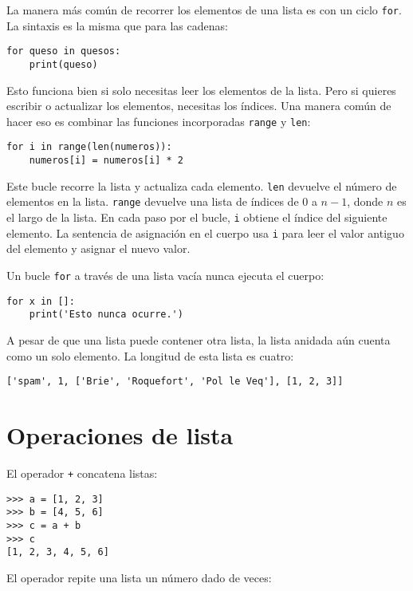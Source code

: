 \documentclass[10pt]{book}
\begin{document}
La manera más común de recorrer los elementos de una lista es
con un ciclo {\tt for}.  La sintaxis es la misma que para las cadenas:

\begin{verbatim}
for queso in quesos:
    print(queso)
\end{verbatim}
%
Esto funciona bien si solo necesitas leer los elementos de la
lista.  Pero si quieres escribir o actualizar los elementos,
necesitas los índices.  Una manera común de hacer eso es combinar
las funciones incorporadas {\tt range} y {\tt len}:

\begin{verbatim}
for i in range(len(numeros)):
    numeros[i] = numeros[i] * 2
\end{verbatim}
%
Este bucle recorre la lista y actualiza cada elemento.  {\tt len}
devuelve el número de elementos en la lista.  {\tt range} devuelve
una lista de índices de 0 a $n-1$, donde $n$ es el largo de
la lista.  En cada paso por el bucle, {\tt i} obtiene el índice
del siguiente elemento.  La sentencia de asignación en el cuerpo usa
{\tt i} para leer el valor antiguo del elemento y asignar el
nuevo valor.

Un bucle {\tt for} a través de una lista vacía nunca ejecuta el cuerpo:

\begin{verbatim}
for x in []:
    print('Esto nunca ocurre.')
\end{verbatim}
%
A pesar de que una lista puede contener otra lista, la lista
anidada aún cuenta como un solo elemento.  La longitud de esta lista es
cuatro:

\begin{verbatim}
['spam', 1, ['Brie', 'Roquefort', 'Pol le Veq'], [1, 2, 3]]
\end{verbatim}



\section{Operaciones de lista}

El operador {\tt +} concatena listas:

\begin{verbatim}
>>> a = [1, 2, 3]
>>> b = [4, 5, 6]
>>> c = a + b
>>> c
[1, 2, 3, 4, 5, 6]
\end{verbatim}
%
El operador {\tt *} repite una lista un número dado de veces:
\end{document}
